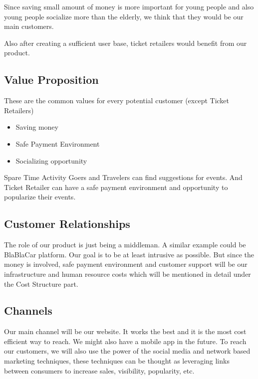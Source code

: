 \documentclass{article}
\begin{document}
Since saving small amount of money is more important for young people and also young people socialize more than the elderly, we think that they would be our main customers.

Also after creating a sufficient user base, ticket retailers would benefit from our product.

\vspace{-3mm}
\subsection{Value Proposition}
These are the common values for every potential customer (except Ticket Retailers)
\begin{itemize}
    \item Saving money
    \item Safe Payment Environment
    \item Socializing opportunity
\end{itemize}

Spare Time Activity Goers and Travelers can find suggestions for events. And Ticket Retailer can have a safe payment environment and opportunity to popularize their events.



\vspace{-3mm}
\subsection{Customer Relationships}

The role of our product is just being a middleman. A similar example could be BlaBlaCar platform. Our goal is to be at least intrusive as possible. But since the money is involved, safe payment environment and customer support will be our infrastructure and human resource costs which will be mentioned in detail under the Cost Structure part.


\vspace{-3mm}
\subsection{Channels}

Our main channel will be our website. It works the best and it is the most cost efficient way to reach. We might also have a mobile app in the future. To reach our customers, we will also use the power of the social media and network based marketing techniques, these techniques can be thought as leveraging links between consumers to increase sales, visibility, popularity, etc.
\end{document}
